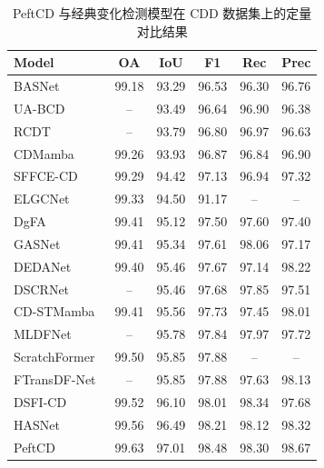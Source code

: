 \begin{table}[!htb]
\centering
\caption{PeftCD 与经典变化检测模型在 CDD 数据集上的定量对比结果}
\label{tab:peftcd_cdd}
\begin{tabular}{l c c c c c}
\toprule
\textbf{Model} & \textbf{OA} & \textbf{IoU} & \textbf{F1} & \textbf{Rec} & \textbf{Prec} \\
\midrule
BASNet~\cite{z_wang_bitemporal_2024} & 99.18 & 93.29 & 96.53 & 96.30 & 96.76 \\  
UA-BCD~\cite{li_overcoming_2025}     & --    & 93.49 & 96.64 & 96.90 & 96.38 \\
RCDT~\cite{lu_cross_2024}                  & --    & 93.79 & 96.80 & 96.97 & 96.63 \\
CDMamba~\cite{zhang_cdmamba_2025}    & 99.26 & 93.93 & 96.87 & 96.84 & 96.90 \\
SFFCE-CD~\cite{y_xing_sffce-cd_2025}   & 99.29 & 94.42 & 97.13 & 96.94 &  97.32 \\
ELGCNet~\cite{m_noman_elgc-net_2024}   & 99.33  &  94.50   & 91.17  & --   & -- \\   
DgFA~\cite{f_zhou_dual-granularity_2025} & 99.41 & 95.12 & 97.50 & 97.60 & 97.40 \\
GASNet~\cite{zhang_global-aware_2023}  & 99.41  & 95.34  & 97.61  & 98.06  & 97.17 \\
DEDANet~\cite{Li2025DifferenceEA} & 99.40 & 95.46 & 97.67 & 97.14 & 98.22 \\
DSCRNet ~\cite{Zhang2025ADS} & -- & 95.46 & 97.68 & 97.85 & 97.51 \\
CD-STMamba~\cite{Liu2025CDSTMambaTR} & 99.41 & 95.56 & 97.73 & 97.45 & 98.01 \\
MLDFNet~\cite{d_sidekejiang_mldfnet_2025}  & -- & 95.78 & 97.84 & 97.97 & 97.72 \\
ScratchFormer~\cite{Noman2023RemoteSC}   & 99.50 & 95.85  & 97.88 & -- & -- \\ 
FTransDF-Net~\cite{li_dual_2025}   & -- & 95.85 &  97.88 & 97.63 & 98.13 \\
DSFI-CD~\cite{x_li_dsfi-cd_2025}  & 99.52 & 96.10 &  98.01 & 98.34 & 97.68 \\
HASNet~\cite{c_tao_hasnet_2025}        & 99.56 & 96.49 & 98.21 & 98.12 & 98.32 \\
\midrule
PeftCD & 99.63 & 97.01 & 98.48 & 98.30 & 98.67 \\
\bottomrule
\end{tabular}
\end{table}

